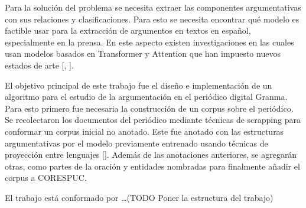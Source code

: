 
Para la solución del problema se necesita extraer las componentes argumentativas con sus relaciones
y clasificaciones. Para esto se necesita encontrar qué modelo es factible usar para la extracción de
argumentos en textos en español, especialmente en la prensa. En este aspecto existen investigaciones
en las cuales usan modelos basados en Transformer y Attention que han impuesto nuevos estados de arte
[\cite{mayer2020transformer}, \cite{galassi2018argumentative}].



El objetivo principal de este trabajo fue el diseño e implementación de un algoritmo para 
el estudio de la argumentación en el periódico digital Granma. Para esto primero
fue necesaria la construcción de un corpus sobre el periódico. Se recolectaron los documentos
del periódico mediante técnicas de scrapping para conformar un corpus inicial no anotado. Este
fue anotado con las estructuras argumentativas por el modelo previamente entrenado usando técnicas 
de proyección entre lenguajes [\cite{eger2018cross}]. Además de las anotaciones anteriores, se agregarán 
otras, como partes de la oración y entidades nombradas para finalmente añadir el corpus a CORESPUC.


El trabajo está conformado por \dots (TODO Poner la estructura del trabajo)


